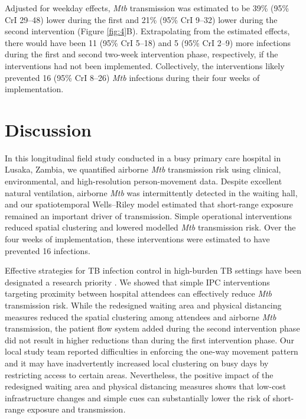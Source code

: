 \documentclass[11pt]{article}
\begin{document}
Adjusted for weekday effects, \emph{Mtb} transmission was estimated to be 39\% (95\% CrI 29--48) lower during the first and 21\% (95\% CrI 9--32) lower during the second intervention (Figure \ref{fig:4}B). Extrapolating from the estimated effects, there would have been 11 (95\% CrI 5--18) and 5 (95\% CrI 2--9) more infections during the first and second two-week intervention phase, respectively, if the interventions had not been implemented. Collectively, the interventions likely prevented 16 (95\% CrI 8--26) \emph{Mtb} infections during their four weeks of implementation.

\section{Discussion}\label{discussion}

In this longitudinal field study conducted in a busy primary care hospital in Lusaka, Zambia, we quantified airborne \emph{Mtb} transmission risk using clinical, environmental, and high-resolution person-movement data. Despite excellent natural ventilation, airborne \emph{Mtb} was intermittently detected in the waiting hall, and our spatiotemporal Wells--Riley model estimated that short-range exposure remained an important driver of transmission. Simple operational interventions reduced spatial clustering and lowered modelled \emph{Mtb} transmission risk. Over the four weeks of implementation, these interventions were estimated to have prevented 16 infections.

Effective strategies for TB infection control in high-burden TB settings have been designated a research priority \cite{yates2016LancetInfectDis}. We showed that simple IPC interventions targeting proximity between hospital attendees can effectively reduce \emph{Mtb} transmission risk. While the redesigned waiting area and physical distancing measures reduced the spatial clustering among attendees and airborne \emph{Mtb} transmission, the patient flow system added during the second intervention phase did not result in higher reductions than during the first intervention phase. Our local study team reported difficulties in enforcing the one-way movement pattern and it may have inadvertently increased local clustering on busy days by restricting access to certain areas. Nevertheless, the positive impact of the redesigned waiting area and physical distancing measures shows that low-cost infrastructure changes and simple cues can substantially lower the risk of short-range exposure and transmission\emph{.}
\end{document}
